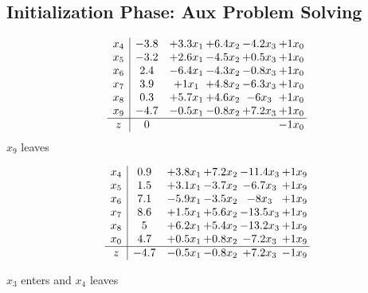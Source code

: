 \documentclass[12pt]{article}
\begin{document}
\subsection{Initialization Phase: Aux Problem Solving}
\[\begin{array}{c| c c@{\hskip 2pt} c@{\hskip 2pt} c@{\hskip 2pt} c@{\hskip 2pt} }
 x_{4}   &  -3.8 & + 3.3 x_{1} & + 6.4 x_{2} & -4.2 x_{3} & + 1 x_{0}\\
 x_{5}   &  -3.2 & + 2.6 x_{1} & -4.5 x_{2} & + 0.5 x_{3} & + 1 x_{0}\\
 x_{6}   &  2.4 & -6.4 x_{1} & -4.3 x_{2} & -0.8 x_{3} & + 1 x_{0}\\
 x_{7}   &  3.9 & + 1 x_{1} & + 4.8 x_{2} & -6.3 x_{3} & + 1 x_{0}\\
 x_{8}   &  0.3 & + 5.7 x_{1} & + 4.6 x_{2} & -6 x_{3} & + 1 x_{0}\\
 x_{9}   &  -4.7 & -0.5 x_{1} & -0.8 x_{2} & + 7.2 x_{3} & + 1 x_{0}\\
\hline
z    &  0  &    &    &   & -1 x_{0}\\
\end{array}\]
$ x_{9} $ leaves 

 \[\begin{array}{c| c c@{\hskip 2pt} c@{\hskip 2pt} c@{\hskip 2pt} c@{\hskip 2pt} }
 x_{4}   &  0.9 & + 3.8 x_{1} & + 7.2 x_{2} & -11.4 x_{3} & + 1 x_{9}\\
 x_{5}   &  1.5 & + 3.1 x_{1} & -3.7 x_{2} & -6.7 x_{3} & + 1 x_{9}\\
 x_{6}   &  7.1 & -5.9 x_{1} & -3.5 x_{2} & -8 x_{3} & + 1 x_{9}\\
 x_{7}   &  8.6 & + 1.5 x_{1} & + 5.6 x_{2} & -13.5 x_{3} & + 1 x_{9}\\
 x_{8}   &  5 & + 6.2 x_{1} & + 5.4 x_{2} & -13.2 x_{3} & + 1 x_{9}\\
 x_{0}   &  4.7 & + 0.5 x_{1} & + 0.8 x_{2} & -7.2 x_{3} & + 1 x_{9}\\
\hline
z    &  -4.7 & -0.5 x_{1} & -0.8 x_{2} & + 7.2 x_{3} & -1 x_{9}\\
\end{array}\]


 $ x_{3} $ enters and $ x_{4} $ leaves 
\end{document}
